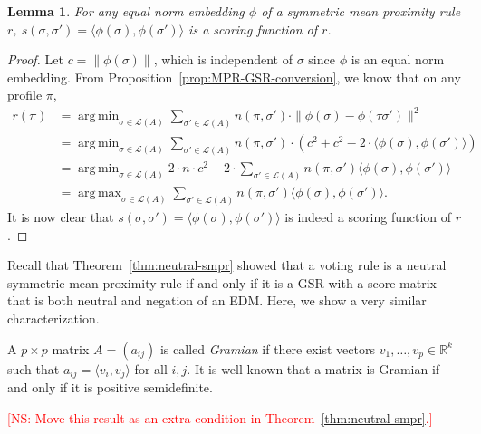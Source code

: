 \documentclass[10pt,letterpaper]{article}
\newcommand{\calL}{{\mathcal{L}}}
\newcommand{\rank}{{\calL(A)}}
\DeclareMathOperator*{\argmax}{arg\,max}
\DeclareMathOperator*{\argmin}{arg\,min}
\newtheorem{lemma}{Lemma}
\newenvironment{definition}[1][Definition]{\begin{trivlist}
\item[\hskip \labelsep {\bfseries #1}]}{\end{trivlist}}
\newcommand{\kibitz}[2]{\ifnum\Comments=1\textcolor{#1}{#2}\fi}
\newcommand{\cns}[1]{\kibitz{red} {[NS: #1]}}
\begin{document}
\begin{lemma}
For any equal norm embedding $\phi$ of a symmetric mean proximity rule $r$, $s(\sigma,\sigma') = \langle \phi(\sigma),\phi(\sigma') \rangle$ is a scoring function of $r$. 
\label{lem:inner-product}
\end{lemma}
\begin{proof}
Let $c = \|\phi(\sigma)\|$, which is independent of $\sigma$ since $\phi$ is an equal norm embedding. From Proposition~\ref{prop:MPR-GSR-conversion}, we know that on any profile $\pi$, 
\begin{align*}
r(\pi) &= \argmin_{\sigma \in \rank} \sum_{\sigma' \in \rank} n(\pi,\sigma') \cdot \|\phi(\sigma)-\phi(\tau \sigma')\|^2 \\
&= \argmin_{\sigma \in \rank} \sum_{\sigma' \in \rank} n(\pi,\sigma') \cdot \left( c^2 + c^2 - 2 \cdot \langle \phi(\sigma), \phi(\sigma')\rangle\right) \\
&= \argmin_{\sigma \in \rank} 2 \cdot n \cdot c^2 - 2 \cdot \sum_{\sigma' \in \rank} n(\pi,\sigma') \langle \phi(\sigma), \phi(\sigma')\rangle \\
&= \argmax_{\sigma \in \rank} \sum_{\sigma' \in \rank} n(\pi,\sigma') \langle \phi(\sigma), \phi(\sigma')\rangle.
\end{align*}
It is now clear that $s(\sigma,\sigma') = \langle \phi(\sigma),\phi(\sigma') \rangle$ is indeed a scoring function of $r$. 
\end{proof}

Recall that Theorem~\ref{thm:neutral-smpr} showed that a voting rule is a neutral symmetric mean proximity rule if and only if it is a GSR with a score matrix that is both neutral and negation of an EDM. Here, we show a very similar characterization.

\begin{definition}[Gramian Matrix]
A $p \times p$ matrix $A = (a_{ij})$ is called \emph{Gramian} if there exist vectors $v_1,\ldots,v_p \in \mathbb{R}^k$ such that $a_{ij} = \langle v_i,v_j \rangle$ for all $i,j$. It is well-known that a matrix is Gramian if and only if it is positive semidefinite. 
\end{definition}

\cns{Move this result as an extra condition in Theorem~\ref{thm:neutral-smpr}.}
\end{document}
